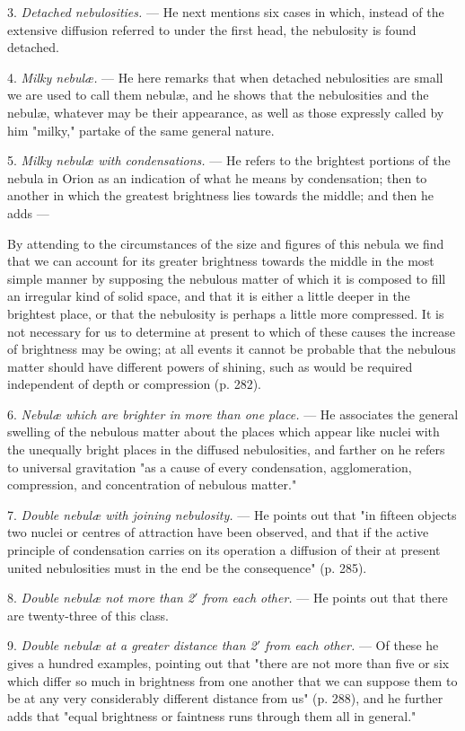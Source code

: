 \documentclass[a4paper, 12pt, oneside, polutonikogreek, english]{article}
\begin{document}
3. \emph{Detached nebulosities.} --- He next mentions six cases in which, instead of the extensive diffusion referred to under the first head, the nebulosity is found detached.

4. \emph{Milky nebulæ.} --- He here remarks that when detached nebulosities are small we are used to call them nebulæ, and he shows that the nebulosities and the nebulæ, whatever may be their appearance, as well as those expressly called by him "milky," partake of the same general nature.

5. \emph{Milky nebulæ with condensations.} --- He refers to the brightest portions of the nebula in Orion as an indication of what he means by condensation; then to another in which the greatest brightness lies towards the middle; and then he adds ---

By attending to the circumstances of the size and figures of this nebula we find that we can account for its greater brightness towards the middle in the most simple manner by supposing the nebulous matter of which it is composed to fill an irregular kind of solid space, and that it is either a little deeper in the brightest place, or that the nebulosity is perhaps a little more compressed. It is not necessary for us to determine at present to which of these causes the increase of brightness may be owing; at all events it cannot be probable that the nebulous matter should have different powers of shining, such as would be required independent of depth or compression (p. 282).

6. \emph{Nebulæ which are brighter in more than one place.} --- He associates the general swelling of the nebulous matter about the places which appear like nuclei with the unequally bright places in the diffused nebulosities, and farther on he refers to universal gravitation "as a cause of every condensation, agglomeration, compression, and concentration of nebulous matter."

7. \emph{Double nebulæ with joining nebulosity.} --- He points out that "in fifteen objects two nuclei or centres of attraction have been observed, and that if the active principle of condensation carries on its operation a diffusion of their at present united nebulosities must in the end be the consequence" (p. 285).

8. \emph{Double nebulæ not more than 2$\prime$ from each other.} --- He points out that there are twenty-three of this class.

9. \emph{Double nebulæ at a greater distance than 2$\prime$ from each other.} --- Of these he gives a hundred examples, pointing out that "there are not more than five or six which differ so much in brightness from one another that we can suppose them to be at any very considerably different distance from us" (p. 288), and he further adds that "equal brightness or faintness runs through them all in general."
\end{document}
